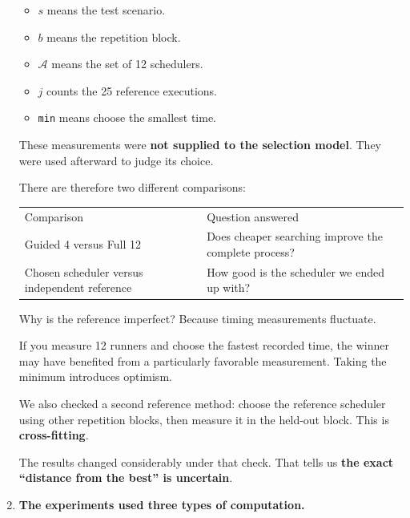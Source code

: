 \documentclass[11pt,a4paper]{article}
\providecommand{\tightlist}{\setlength{\itemsep}{0pt}\setlength{\parskip}{3pt}}
\newcommand{\toprule}{\hline\noalign{\vskip3pt}}
\newcommand{\midrule}{\noalign{\vskip2pt}\hline\noalign{\vskip3pt}}
\newcommand{\bottomrule}{\noalign{\vskip3pt}\hline}
\begin{document}
\begin{enumerate}
  \begin{itemize}
  \tightlist
  \item
    \(s\) means the test scenario.
  \item
    \(b\) means the repetition block.
  \item
    \(\mathcal A\) means the set of 12 schedulers.
  \item
    \(j\) counts the 25 reference executions.
  \item
    \texttt{min} means choose the smallest time.
  \end{itemize}

  These measurements were \textbf{not supplied to the selection model}. They were used afterward to judge its choice.

  There are therefore two different comparisons:

  {\def\LTcaptype{none} %
  \begin{longtable}[]{@{}
    >{\raggedright\arraybackslash}p{}
    >{\raggedright\arraybackslash}p{}@{}}
  \toprule\noalign{}
  \begin{minipage}[b]{\linewidth}\raggedright
  Comparison
  \end{minipage} & \begin{minipage}[b]{\linewidth}\raggedright
  Question answered
  \end{minipage} \\
  \midrule\noalign{}
  \endhead
  \bottomrule\noalign{}
  \endlastfoot
  Guided 4 versus Full 12 & Does cheaper searching improve the complete process? \\
  Chosen scheduler versus independent reference & How good is the scheduler we ended up with? \\
  \end{longtable}
  }

  Why is the reference imperfect? Because timing measurements fluctuate.

  If you measure 12 runners and choose the fastest recorded time, the winner may have benefited from a particularly favorable measurement. Taking the minimum introduces optimism.

  We also checked a second reference method: choose the reference scheduler using other repetition blocks, then measure it in the held-out block. This is \textbf{cross-fitting}.

  The results changed considerably under that check. That tells us \textbf{the exact ``distance from the best'' is uncertain}.
\item
  \textbf{The experiments used three types of computation.}


\end{enumerate}
\end{document}
